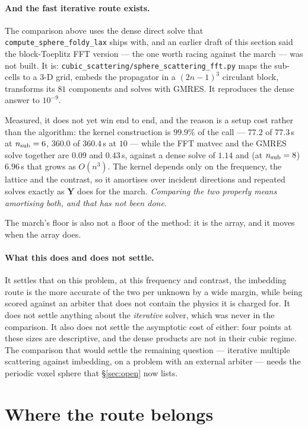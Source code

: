 \documentclass[11pt,a4paper]{article}
\newcommand{\bY}{\mathbf{Y}}
\begin{document}
\paragraph{And the fast iterative route exists.}  The comparison above uses the
dense direct solve that \texttt{compute\_sphere\_foldy\_lax} ships with, and an
earlier draft of this section said the block-Toeplitz FFT version --- the one
worth racing against the march --- was not built.  It is:
\texttt{cubic\_scattering/sphere\_scattering\_fft.py} maps the sub-cells to a
$3$-D grid, embeds the propagator in a $(2n-1)^3$ circulant block, transforms
its $81$ components and solves with GMRES.  It reproduces the dense answer to
$10^{-9}$.

Measured, it does not yet win end to end, and the reason is a setup cost rather
than the algorithm: the kernel construction is $99.9\%$ of the call --- $77.2$
of $77.3$\,s at $n_{\rm sub}=6$, $360.0$ of $360.4$\,s at $10$ --- while the FFT
matvec and the GMRES solve together are $0.09$ and $0.43$\,s, against a dense
solve of $1.14$ and (at $n_{\rm sub}=8$) $6.96$\,s that grows as $O(n^3)$.  The
kernel depends only on the frequency, the lattice and the contrast, so it
amortises over incident directions and repeated solves exactly as $\bY$ does for
the march.  \emph{Comparing the two properly means amortising both, and that has
not been done.}

The march's floor is also not a floor of the method: it is the array, and it
moves when the array does.

\paragraph{What this does and does not settle.}  It settles that on this
problem, at this frequency and contrast, the imbedding route is the more
accurate of the two per unknown by a wide margin, while being scored against an
arbiter that does not contain the physics it is charged for.  It does not settle
anything about the \emph{iterative} solver, which was never in the comparison.
It also does not settle the asymptotic cost of either: four points at these
sizes are descriptive, and the dense products are not in their cubic regime.
The comparison that would settle the remaining question --- iterative multiple
scattering against imbedding, on a problem with an external arbiter --- needs
the periodic voxel sphere that \S\ref{sec:open} now lists.

\section{Where the route belongs}
\end{document}
